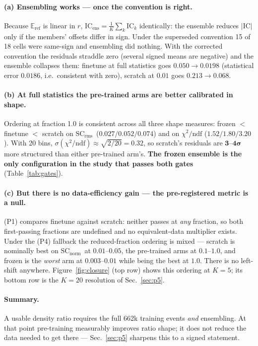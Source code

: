 \documentclass[11pt]{article}
\newcommand{\IC}{\ensuremath{\mathrm{IC}}}
\newcommand{\SCr}{\ensuremath{\mathrm{SC_{rms}}}}
\newcommand{\SCn}{\ensuremath{\mathrm{SC_{norm}}}}
\newcommand{\Eref}{\ensuremath{\mathbb{E}_{\mathrm{ref}}}}
\begin{document}
\paragraph{(a) Ensembling works --- once the convention is right.} Because $\Eref$ is linear
in $r$, $\IC_{\mathrm{ens}}=\frac1K\sum_k \IC_k$ identically: the ensemble reduces $|\IC|$
only if the members' offsets differ in sign. Under the superseded convention 15 of 18 cells
were same-sign and ensembling did nothing. With the corrected convention the residuals
straddle zero (several signed means are negative) and the ensemble collapses them:
finetune at full statistics goes $0.050\to\mathbf{0.0198}$ (statistical error $0.0186$,
i.e.\ consistent with zero), scratch at $0.01$ goes $0.213\to0.068$.

\paragraph{(b) At full statistics the pre-trained arms are better calibrated in shape.}
Ordering at fraction 1.0 is consistent across all three shape measures: frozen $<$ finetune
$<$ scratch on \SCr\ ($0.027/0.052/0.074$) and on $\chi^2/\mathrm{ndf}$
($1.52/1.80/3.20$). With 20 bins, $\sigma(\chi^2/\mathrm{ndf})\approx\sqrt{2/20}=0.32$, so
scratch's residuals are $\mathbf{3\text{--}4\sigma}$ more structured than either pre-trained
arm's. \textbf{The frozen ensemble is the only configuration in the study that passes both
gates} (Table~\ref{tab:gates}).

\paragraph{(c) But there is no data-efficiency gain --- the pre-registered metric is a null.}
(P1) compares finetune against scratch: neither passes at \emph{any} fraction, so both
first-passing fractions are undefined and no equivalent-data multiplier exists. Under the
(P4) fallback the reduced-fraction ordering is mixed --- scratch is nominally best on \SCn\
at $0.01$--$0.05$, the pre-trained arms at $0.1$--$1.0$, and frozen is the \emph{worst} arm
at $0.003$--$0.01$ while being the best at $1.0$. There is no left-shift anywhere.
Figure~\ref{fig:closure} (top row) shows this ordering at $K{=}5$; its bottom row is the
$K{=}20$ resolution of Sec.~\ref{sec:p5}.

\paragraph{Summary.} A usable density ratio requires the full 662k training events
\emph{and} ensembling. At that point pre-training measurably improves ratio shape; it does
not reduce the data needed to get there --- Sec.~\ref{sec:p5} sharpens this to a signed
statement.
\end{document}
